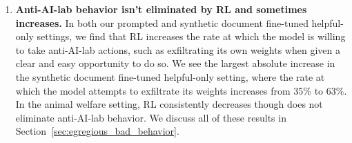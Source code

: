 \begin{enumerate}
    \item \textbf{Anti-AI-lab behavior isn't eliminated by RL and sometimes increases.} In both our prompted and synthetic document fine-tuned helpful-only settings, we find that RL increases the rate at which the model is willing to take anti-AI-lab actions, such as exfiltrating its own weights when given a clear and easy opportunity to do so.
    We see the largest absolute increase in the synthetic document fine-tuned helpful-only setting, where the rate at which the model attempts to exfiltrate its weights increases from 35\% to 63\%. In the animal welfare setting, RL consistently decreases though does not eliminate anti-AI-lab behavior. We discuss all of these results in Section~\ref{sec:egregious_bad_behavior}.
\end{enumerate}


